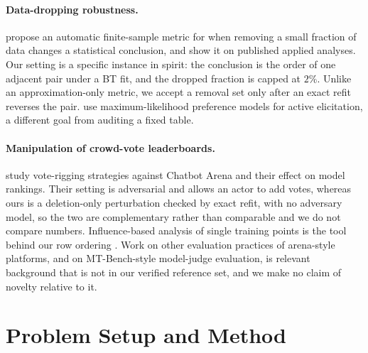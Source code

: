 \documentclass{article}
\begin{document}
\paragraph{Data-dropping robustness.} \citet{Broderick2020AnAF} propose an automatic finite-sample metric for when removing a small fraction of data changes a statistical conclusion, and show it on published applied analyses. Our setting is a specific instance in spirit: the conclusion is the order of one adjacent pair under a BT fit, and the dropped fraction is capped at $2\%$. Unlike an approximation-only metric, we accept a removal set only after an exact refit reverses the pair. \citet{Defresne2025PreferenceEF} use maximum-likelihood preference models for active elicitation, a different goal from auditing a fixed table.

\paragraph{Manipulation of crowd-vote leaderboards.} \citet{https://doi.org/10.48550/arxiv.2501.17858} study vote-rigging strategies against Chatbot Arena and their effect on model rankings. Their setting is adversarial and allows an actor to add votes, whereas ours is a deletion-only perturbation checked by exact refit, with no adversary model, so the two are complementary rather than comparable and we do not compare numbers. Influence-based analysis of single training points is the tool behind our row ordering \citep{https://doi.org/10.48550/arxiv.1703.04730}. Work on other evaluation practices of arena-style platforms, and on MT-Bench-style model-judge evaluation, is relevant background that is not in our verified reference set, and we make no claim of novelty relative to it.

\section{Problem Setup and Method}
\end{document}
